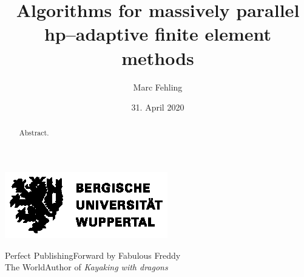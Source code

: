 \documentclass[10pt,a4paper,twoside,openright]{memoir}
\author{Marc Fehling}
\title{Algorithms for massively parallel hp--adaptive finite element methods}
\date{31. April 2020}
\begin{document}
  \begin{titlingpage}
    \begin{center}
      \vspace*{\fill}
      \includegraphics[width=.75\textwidth]{logos/BUW_Logo-schwarz.eps}\bigskip
      \vspace*{\fill}\vspace*{\fill}\par
      {\Huge \thetitle\bigskip\par}
      {\Huge \theauthor\bigskip\par}
      {\LARGE \thedate\bigskip\bigskip\par}
    \end{center}
    {\large Perfect Publishing\hspace*{\fill}Forward by Fabulous Freddy\smallskip\\
    The World\hspace*{\fill}Author of \emph{Kayaking with dragons}}
  \end{titlingpage}
  
  
  
  \frontmatter
  
  \abstractintoc
  \begin{abstract}
    Abstract.
  \end{abstract}
  \clearpage
  
  
  \begin{KeepFromToc} %
    \tableofcontents
  \end{KeepFromToc}
  \clearpage
  
  
  
  \listoftables
  \clearpage
  
  \listoffigures
  \clearpage
  
  \printglossary[type=\acronymtype, title={List of Abbreviations}]
  
  
  
  
  
  \mainmatter
  
  
  
  
  
  
  
  \appendix
  
  
  
  
  \backmatter
  
  \printbibliography
  
  \listoftodos
\end{document}
